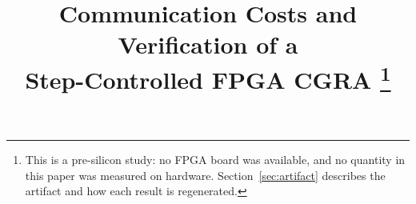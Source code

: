 \title{Communication Costs and Verification of a\\Step-Controlled FPGA CGRA%
\thanks{This is a pre-silicon study: no FPGA board was available, and no
quantity in this paper was measured on hardware. Section~\ref{sec:artifact}
describes the artifact and how each result is regenerated.}}

\author{%
}

\maketitle
